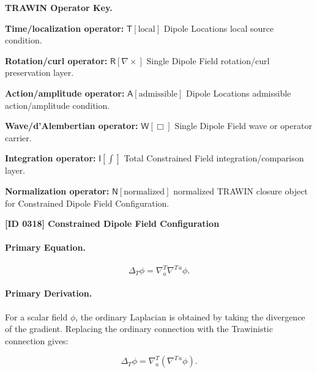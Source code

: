 \par\vspace{0.45\baselineskip}
\noindent\begin{minipage}[t]{\linewidth}
\begingroup
\small
\raggedright
\textbf{TRAWIN Operator Key.}\par
\noindent\textbf{Time/localization operator:} $\mathsf{T}\!\left[\mathrm{local}\right]$ Dipole Locations local source condition.\par
\noindent\textbf{Rotation/curl operator:} $\mathsf{R}\!\left[\nabla\times\right]$ Single Dipole Field rotation/curl preservation layer.\par
\noindent\textbf{Action/amplitude operator:} $\mathsf{A}\!\left[\mathrm{admissible}\right]$ Dipole Locations admissible action/amplitude condition.\par
\noindent\textbf{Wave/d'Alembertian operator:} $\mathsf{W}\!\left[\Box\right]$ Single Dipole Field wave or operator carrier.\par
\noindent\textbf{Integration operator:} $\mathsf{I}\!\left[\int\right]$ Total Constrained Field integration/comparison layer.\par
\noindent\textbf{Normalization operator:} $\mathsf{N}\!\left[\mathrm{normalized}\right]$ normalized TRAWIN closure object for Constrained Dipole Field Configuration.\par
\endgroup
\end{minipage}

\clearpage
\noindent\textbf{[ID 0318] Constrained Dipole Field Configuration}\par
\vspace{0.35em}
\paragraph{Primary Equation.}
\begin{equation}
\Delta_T\phi
=
\nabla^{T}_{a}\nabla^{T\,a}\phi .
\end{equation}

\paragraph{Primary Derivation.}
For a scalar field $\phi$, the ordinary Laplacian is obtained by taking the divergence of the gradient.  
Replacing the ordinary connection with the Trawinistic connection gives:

\begin{equation}
\Delta_T\phi
=
\nabla^{T}_{a}
\left(
\nabla^{T\,a}\phi
\right).
\end{equation}

